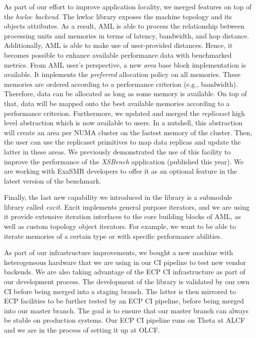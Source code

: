 As part of our effort to improve application locality, we merged
features on top of the \emph{hwloc backend}. The hwloc library exposes the machine
topology and its objects attributes. As a result, AML is able
to process the relationship between processing units and memories in
terms of latency, bandwidth, and hop distance. Additionally, AML is
able to make use of user-provided distances. Hence, it becomes
possible to enhance available performance data with benchmarked metrics.
From AML user's perspective, a new \emph{area} base block implementation
is available. It implements the \emph{preferred} allocation policy on all
memories. These memories are ordered according to a performance
criterion (e.g., bandwidth). Therefore, data can be allocated as long as
some memory is available. On top of that, data will be mapped onto the best
available memories according to a performance criterion. Furthermore,
we updated and merged the \emph{replicaset} high level abstraction which
is now available to users. In a nutshell, this abstraction will
create an area per NUMA cluster on the fastest memory of the cluster.
Then, the user can use the replicaset primitives to map data replicas
and update the latter in these areas. We previously demonstrated the use of
this facility to improve the performance of the
\emph{XSBench} application (published this year). We are working with
ExaSMR developers to offer it as an optional feature in the latest version
of the benchmark. 

Finally, the last new capability we introduced in the library is a submodule
library called \emph{excit}. Excit implements general purpose iterators, and we
are using it provide extensive iteration interfaces to the core building blocks
of AML, as well as custom topology object iterators. For example, we want to be
able to iterate memories of a certain type or with specific performance
abilities.

As part of our infrastructure improvements, we bought a new machine
with heterogeneous hardware that we are using in our CI pipeline
to test new vendor backends. We are also taking advantage of the ECP CI
infrastructure as part of our development process. The development of the
library is validated by our own CI before being merged into a staging
branch. The latter is then mirrored to ECP facilities to be further tested by
an ECP CI pipeline, before being merged into our master branch. The goal is to
ensure that our master branch can always be stable on production systems. Our
ECP CI pipeline runs on Theta at ALCF and we are in the process of setting it
up at OLCF.

